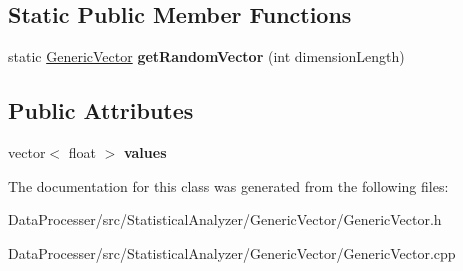\subsection*{Static Public Member Functions}
\begin{DoxyCompactItemize}
\item 
\mbox{\label{classGenericVector_a164eb902cb77e118826a335edbbf3f35}} 
static \hyperlink{classGenericVector}{Generic\+Vector} {\bfseries get\+Random\+Vector} (int dimension\+Length)
\end{DoxyCompactItemize}
\subsection*{Public Attributes}
\begin{DoxyCompactItemize}
\item 
\mbox{\label{classGenericVector_a80fb20717e0826df7fd71f84491bc648}} 
vector$<$ float $>$ {\bfseries values}
\end{DoxyCompactItemize}


The documentation for this class was generated from the following files\+:\begin{DoxyCompactItemize}
\item 
Data\+Processer/src/\+Statistical\+Analyzer/\+Generic\+Vector/Generic\+Vector.\+h\item 
Data\+Processer/src/\+Statistical\+Analyzer/\+Generic\+Vector/Generic\+Vector.\+cpp\end{DoxyCompactItemize}
